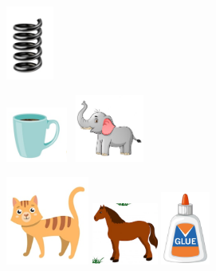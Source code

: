 \includegraphics[width=0.61042in,height=0.95923in]{media/image31.png}

\includegraphics[width=0.78750in,height=0.70972in]{media/image32.png}
\includegraphics[width=1.02361in,height=0.88333in]{media/image33.png}

\includegraphics[width=1.07569in,height=1.14514in]{media/image34.png}
\includegraphics[width=0.85069in,height=0.80069in]{media/image35.png}
\includegraphics[width=0.63333in,height=0.94653in]{media/image36.png}



